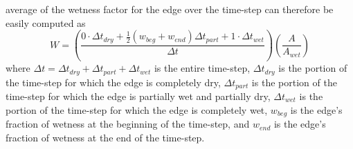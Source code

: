 \documentclass[review]{elsarticle}
\begin{document}
average of the wetness factor for the edge over the time-step can 
therefore be easily computed as
\begin{equation}
        W=\left(\frac{0\cdot\Delta t_{dry} +\frac{1}{2}(w_{beg}+w_{end})\Delta t_{part}+1\cdot\Delta t_{wet}}{\Delta t}\right) \left(\frac{A}{A_{wet}}\right)
        \label{wetnessfactor}
\end{equation}
where $\Delta t=\Delta t_{dry}+\Delta t_{part}+\Delta t_{wet}$ is the 
entire time-step, $\Delta t_{dry}$ is the portion of the time-step for 
which the edge is completely dry, $\Delta t_{part}$ is the portion of 
the time-step for which the edge is partially wet and partially dry, 
$\Delta t_{wet}$ is the portion of the time-step for which the edge is 
completely wet, $w_{beg}$ is the edge's fraction of wetness at the 
beginning of the time-step, and $w_{end}$ is the edge's fraction of 
wetness at the end of the time-step.
\end{document}
